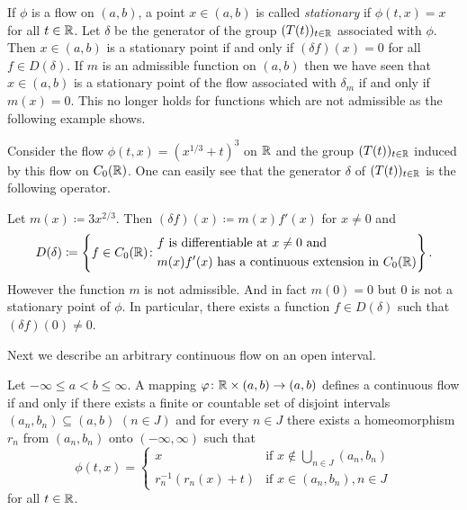 \begin{remark}\label{rem:b2-3.19}
%
If\/ $\phi$ is a flow on $(a,b)$, a point $x \in (a,b)$ is called \emph{stationary} if\/ $\phi(t,x) = x$ for all $t \in \mathbb{R}$.
Let $\delta$ be the generator of the group $(T(t))_{t \in \mathbb{R}}$ associated with $\phi$.
Then $x \in (a,b)$ is a stationary point if and only if\/ $(\delta f)(x) = 0$ for all $f \in D(\delta)$.
If\/ $m$ is an admissible function on $(a,b)$ then we have seen that $x \in (a,b)$ is a stationary point of the flow associated with $\delta_{m}$ if and only if\/ $m(x) = 0$.
This no longer holds for functions which are not admissible as the following example shows.
\end{remark}
\begin{example}\label{ex:b2-3.20}
%
Consider the flow $\phi(t,x) = (x^{1/3} + t)^{3}$ on $\mathbb{R}$ and the group $(T(t))_{t \in \mathbb{R}}$ induced by this flow on $C_{0}(\mathbb{R})$.
One can easily see that the generator $\delta$ of\/ $(T(t))_{t \in \mathbb{R}}$ is the following operator.

Let $m(x) \coloneq 3x^{2/3}$.
Then $(\delta f)(x) \coloneq m(x)f'(x)$ for $x \neq 0$ and 
\begin{equation*}
D(\delta) \coloneq 
\left\{ f \in C_{0}(\mathbb{R}) \colon 
\begin{aligned}
	&f \text{ is differentiable at } x \neq 0 \text{ and } \\
	&m(x)f'(x) \text{ has a continuous extension in } C_{0}(\mathbb{R})
\end{aligned}
\right\}.
\end{equation*}
However the function $m$ is not admissible.
And in fact $m(0) = 0$ but $0$ is not a stationary point of\/ $\phi$.
In particular, there exists a function $f \in D(\delta)$ such that $(\delta f)(0) \neq 0$.
\end{example}
Next we describe an arbitrary continuous flow on an open interval.
\begin{proposition}\label{prop:b2-3.21}
%
Let $-\infty \leq a < b \leq \infty$.
A mapping $\phi \colon \R \times (a,b) \to (a,b)$ defines a continuous flow if and only if there exists a finite or countable set of disjoint intervals $(a_{n},b_{n}) \subseteq (a,b)$ $(n \in J)$ and for every $n \in J$ there exists a homeomorphism $r_{n}$ from $(a_{n},b_{n})$ onto $(-\infty,\infty)$ such that
\begin{equation*}\label{eq:b2-flow}
\phi(t,x) = \begin{cases}
    x & \text{if } x \notin \bigcup_{n \in J} (a_{n},b_{n}) \\
    r_{n}^{-1}(r_{n}(x) + t) & \text{if } x \in (a_{n},b_{n}), n \in J
\end{cases}
\end{equation*}
for all $t \in \mathbb{R}$.
\end{proposition}
